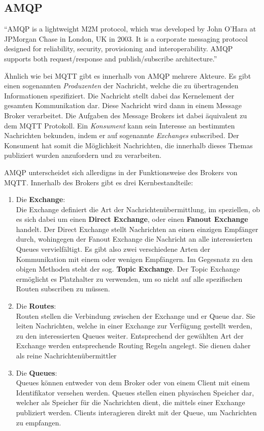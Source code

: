 \subsection{AMQP}

\begin{definition}
    \enquote{AMQP is a lightweight M2M protocol, which was developed by John O’Hara at JPMorgan Chase in London, UK in 2003. It is a corporate messaging protocol designed for reliability, security, provisioning and interoperability. AMQP supports both request/response and publish/subscribe architecture.}\autocite{naik2017choice}
\end{definition}

Ähnlich wie bei \ac{MQTT} gibt es innerhalb von \ac{AMQP} mehrere Akteure. Es gibt einen sogenannten \textit{Produzenten} der Nachricht, welche die zu übertragenden Informationen spezifiziert. Die Nachricht stellt dabei das Kernelement der gesamten Kommunikation dar. Diese Nachricht wird dann in einem Message Broker verarbeitet. Die Aufgaben des Message Brokers ist dabei äquivalent zu dem \ac{MQTT} Protokoll. Ein \textit{Konsument} kann sein Interesse an bestimmten Nachrichten bekunden, indem er auf sogenannte \textit{Exchanges} subscribed. Der Konsument hat somit die Möglichkeit Nachrichten, die innerhalb dieses Themas publiziert wurden anzufordern und zu verarbeiten.

\ac{AMQP} unterscheidet sich allerdigns in der Funktionsweise des Brokers von \ac{MQTT}. Innerhalb des Brokers gibt es drei Kernbestandteile:
\begin{enumerate}
    \item Die \textbf{Exchange}:\\
    Die Exchange definiert die Art der Nachrichtenübermittlung, im speziellen, ob es sich dabei um einen \textbf{Direct Exchange}, oder einen \textbf{Fanout Exchange} handelt. Der Direct Exchange stellt Nachrichten an einen einzigen Empfänger durch, wohingegen der Fanout Exchange die Nachricht an alle interessierten Queues vervielfältigt. Es gibt also zwei verschiedene Arten der Kommunikation mit einem oder wenigen Empfängern. Im Gegesnatz zu den obigen Methoden steht der sog. \textbf{Topic Exchange}. Der Topic Exchange ermöglicht es Platzhalter zu verwenden, um so nicht auf alle spezifischen Routen subscriben zu müssen.
    \item Die \textbf{Routes}:\\
    Routen stellen die Verbindung zwischen der Exchange und er Queue dar. Sie leiten Nachrichten, welche in einer Exchange zur Verfügung gestellt werden, zu den interessierten Queues weiter. Entsprechend der gewählten Art der Exchange werden entsprechende Routing Regeln angelegt. Sie dienen daher als reine Nachrichtenübermittler
    \item Die \textbf{Queues}:\\
    Queues können entweder von dem Broker oder von einem Client mit einem Identifikator versehen werden. Queues stellen einen physischen Speicher dar, welcher als Speicher für die Nachrichten dient, die mittels einer Exchange publiziert werden. Clients interagieren direkt mit der Queue, um Nachrichten zu empfangen.
\end{enumerate}

